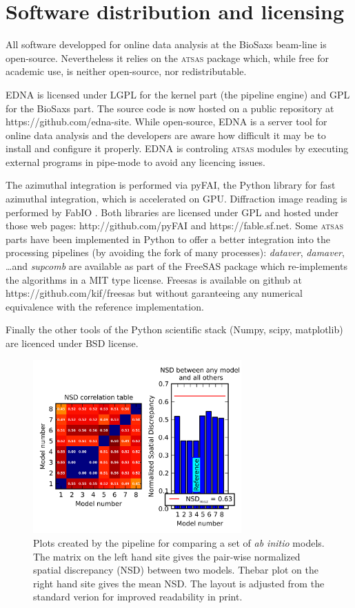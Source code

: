 \documentclass[preprint,pdf]{iucr}              %
\begin{document}
\appendix
\section{Software distribution and licensing}

All software developped for online data analysis at the BioSaxs beam-line is
open-source.
Nevertheless it relies on the \textsc{atsas} package which, while free for
academic use, is neither open-source, nor redistributable.

EDNA is licensed under LGPL for the kernel part (the pipeline engine) and GPL
for the BioSaxs part. The source code is now hosted on a public
repository at https://github.com/edna-site. While open-source, EDNA is a
server tool for online data analysis and the developers are aware how difficult
it may be to install and configure it properly. EDNA is controling
\textsc{atsas} modules by executing external programs in pipe-mode to avoid any
licencing issues.

The azimuthal integration is performed via pyFAI\cite{pyfai}, the Python library
for fast azimuthal integration, which is accelerated on GPU\cite{pyfai_gpu}.
Diffraction image reading is performed by FabIO \cite{fabio}.
Both libraries
are licensed under GPL and hosted under those web pages:
http://github.com/pyFAI and https://fable.sf.net.
Some \textsc{atsas} parts have been implemented in Python to offer a better
integration into the processing pipelines (by avoiding the fork of many
processes): \textit{dataver}, \textit{damaver}, \ldots  and \textit{supcomb}
are available as part of the FreeSAS package which re-implements the
algorithms in a MIT type license. Freesas is available on github at
https://github.com/kif/freesas but without garanteeing any
numerical equivalence with the reference implementation.

Finally the other tools of the Python scientific stack (Numpy, scipy,
matplotlib) are licenced under BSD license.

\begin{figure}
\centering
\includegraphics[width=8cm]{nsd.png}%
\caption{Plots created by the pipeline for comparing a set of \textit{ab initio} models. The matrix on the left hand site gives the pair-wise normalized spatial discrepancy (NSD) between two models. Thebar plot on the right hand site gives the mean NSD. The layout is adjusted from the standard verion for improved readability in print.}
\label{fgr:nsd}
\end{figure}
\end{document}
